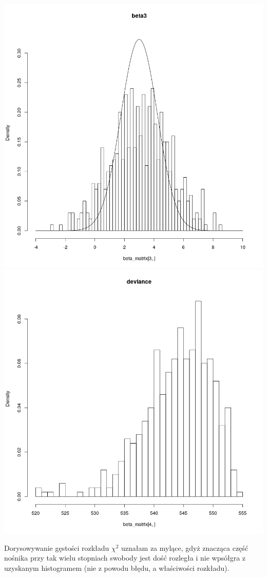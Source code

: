 \documentclass[a4paper,11pt]{article}
\begin{document}
\includegraphics[scale=.35]{beta3.png} 
\includegraphics[scale=.35]{deviance.png} 

Dorysowywanie gęstości rozkładu $\chi^{2}$ uznałam za mylące, gdyż znacząca część nośnika przy tak wielu stopniach swobody jest dość rozległa i nie wpsółgra z uzyskanym histogramem (nie z powodu błędu, a właściwości rozkładu).
\end{document}
